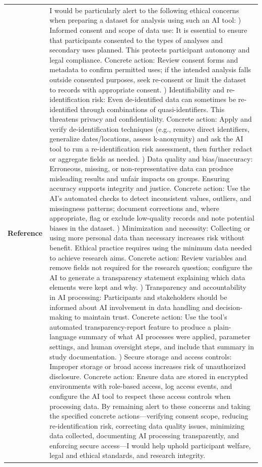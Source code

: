 \begin{longtable}{@{}l p{12.5cm}@{}}
  \textbf{Reference} & I would be particularly alert to the following ethical concerns when preparing a dataset for analysis using such an AI tool: \newline 1) Informed consent and scope of data use: It is essential to ensure that participants consented to the types of analyses and secondary uses planned. This protects participant autonomy and legal compliance. Concrete action: Review consent forms and metadata to confirm permitted uses; if the intended analysis falls outside consented purposes, seek re-consent or limit the dataset to records with appropriate consent. \newline 2) Identifiability and re-identification risk: Even de-identified data can sometimes be re-identified through combinations of quasi-identifiers. This threatens privacy and confidentiality. Concrete action: Apply and verify de-identification techniques (e.g., remove direct identifiers, generalize dates/locations, assess k-anonymity) and ask the AI tool to run a re-identification risk assessment, then further redact or aggregate fields as needed. \newline 3) Data quality and bias/inaccuracy: Erroneous, missing, or non-representative data can produce misleading results and unfair impacts on groups. Ensuring accuracy supports integrity and justice. Concrete action: Use the AI's automated checks to detect inconsistent values, outliers, and missingness patterns; document corrections and, where appropriate, flag or exclude low-quality records and note potential biases in the dataset. \newline 4) Minimization and necessity: Collecting or using more personal data than necessary increases risk without benefit. Ethical practice requires using the minimum data needed to achieve research aims. Concrete action: Review variables and remove fields not required for the research question; configure the AI to generate a transparency statement explaining which data elements were kept and why. \newline 5) Transparency and accountability in AI processing: Participants and stakeholders should be informed about AI involvement in data handling and decision-making to maintain trust. Concrete action: Use the tool's automated transparency-report feature to produce a plain-language summary of what AI processes were applied, parameter settings, and human oversight steps, and include that summary in study documentation. \newline 6) Secure storage and access controls: Improper storage or broad access increases risk of unauthorized disclosure. Concrete action: Ensure data are stored in encrypted environments with role-based access, log access events, and configure the AI tool to respect these access controls when processing data. \newline By remaining alert to these concerns and taking the specified concrete actions---verifying consent scope, reducing re-identification risk, correcting data quality issues, minimizing data collected, documenting AI processing transparently, and enforcing secure access---I would help uphold participant welfare, legal and ethical standards, and research integrity. \\

\end{longtable}
